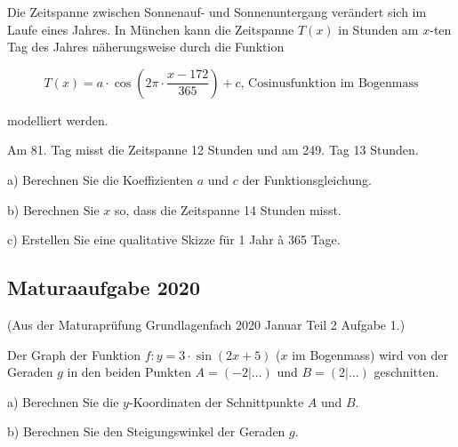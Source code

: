 Die Zeitspanne zwischen Sonnenauf- und Sonnenuntergang verändert sich im Laufe eines Jahres.
In München kann die Zeitspanne $T(x)$ in Stunden am $x$-ten Tag des Jahres näherungsweise durch die Funktion

$$T(x) = a\cdot{}\cos\left( 2\pi\cdot{}\frac{x-172}{365}\right) + c\text{, Cosinusfunktion im Bogenmass}$$

modelliert werden.

Am 81. Tag misst die Zeitspanne 12 Stunden und am 249. Tag 13 Stunden.

a) Berechnen Sie die Koeffizienten $a$ und $c$ der Funktionsgleichung.

b)  Berechnen Sie $x$ so, dass die Zeitspanne 14 Stunden misst.

c)  Erstellen Sie eine qualitative Skizze für 1 Jahr à 365 Tage.


\subsection{Maturaaufgabe 2020}
(Aus der Maturaprüfung Grundlagenfach 2020 Januar Teil 2 Aufgabe 1.)

Der Graph der Funktion $f: y=3\cdot{}\sin(2x+5)$ ($x$ im Bogenmass)  wird von der Geraden $g$ in den beiden Punkten $A=(-2|...)$ und $B=(2|...)$ geschnitten.

a) Berechnen Sie die $y$-Koordinaten der Schnittpunkte $A$ und $B$.

b) Berechnen Sie den Steigungswinkel der Geraden $g$.


